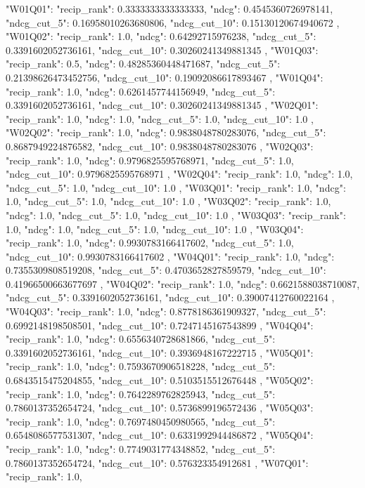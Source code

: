 {
 "W01Q01": {
  "recip_rank": 0.3333333333333333,
  "ndcg": 0.4545360726978141,
  "ndcg_cut_5": 0.16958010263680806,
  "ndcg_cut_10": 0.15130120674940672
 },
 "W01Q02": {
  "recip_rank": 1.0,
  "ndcg": 0.64292715976238,
  "ndcg_cut_5": 0.3391602052736161,
  "ndcg_cut_10": 0.30260241349881345
 },
 "W01Q03": {
  "recip_rank": 0.5,
  "ndcg": 0.48285360448471687,
  "ndcg_cut_5": 0.21398626473452756,
  "ndcg_cut_10": 0.19092086617893467
 },
 "W01Q04": {
  "recip_rank": 1.0,
  "ndcg": 0.6261457744156949,
  "ndcg_cut_5": 0.3391602052736161,
  "ndcg_cut_10": 0.30260241349881345
 },
 "W02Q01": {
  "recip_rank": 1.0,
  "ndcg": 1.0,
  "ndcg_cut_5": 1.0,
  "ndcg_cut_10": 1.0
 },
 "W02Q02": {
  "recip_rank": 1.0,
  "ndcg": 0.9838048780283076,
  "ndcg_cut_5": 0.8687949224876582,
  "ndcg_cut_10": 0.9838048780283076
 },
 "W02Q03": {
  "recip_rank": 1.0,
  "ndcg": 0.9796825595768971,
  "ndcg_cut_5": 1.0,
  "ndcg_cut_10": 0.9796825595768971
 },
 "W02Q04": {
  "recip_rank": 1.0,
  "ndcg": 1.0,
  "ndcg_cut_5": 1.0,
  "ndcg_cut_10": 1.0
 },
 "W03Q01": {
  "recip_rank": 1.0,
  "ndcg": 1.0,
  "ndcg_cut_5": 1.0,
  "ndcg_cut_10": 1.0
 },
 "W03Q02": {
  "recip_rank": 1.0,
  "ndcg": 1.0,
  "ndcg_cut_5": 1.0,
  "ndcg_cut_10": 1.0
 },
 "W03Q03": {
  "recip_rank": 1.0,
  "ndcg": 1.0,
  "ndcg_cut_5": 1.0,
  "ndcg_cut_10": 1.0
 },
 "W03Q04": {
  "recip_rank": 1.0,
  "ndcg": 0.9930783166417602,
  "ndcg_cut_5": 1.0,
  "ndcg_cut_10": 0.9930783166417602
 },
 "W04Q01": {
  "recip_rank": 1.0,
  "ndcg": 0.7355309808519208,
  "ndcg_cut_5": 0.4703652827859579,
  "ndcg_cut_10": 0.41966500663677697
 },
 "W04Q02": {
  "recip_rank": 1.0,
  "ndcg": 0.6621588038710087,
  "ndcg_cut_5": 0.3391602052736161,
  "ndcg_cut_10": 0.39007412760022164
 },
 "W04Q03": {
  "recip_rank": 1.0,
  "ndcg": 0.8778186361909327,
  "ndcg_cut_5": 0.6992148198508501,
  "ndcg_cut_10": 0.7247145167543899
 },
 "W04Q04": {
  "recip_rank": 1.0,
  "ndcg": 0.6556340728681866,
  "ndcg_cut_5": 0.3391602052736161,
  "ndcg_cut_10": 0.3936948167222715
 },
 "W05Q01": {
  "recip_rank": 1.0,
  "ndcg": 0.7593670906518228,
  "ndcg_cut_5": 0.6843515475204855,
  "ndcg_cut_10": 0.5103515512676448
 },
 "W05Q02": {
  "recip_rank": 1.0,
  "ndcg": 0.7642289762825943,
  "ndcg_cut_5": 0.7860137352654724,
  "ndcg_cut_10": 0.5736899196572436
 },
 "W05Q03": {
  "recip_rank": 1.0,
  "ndcg": 0.7697480450980565,
  "ndcg_cut_5": 0.6548086577531307,
  "ndcg_cut_10": 0.6331992944486872
 },
 "W05Q04": {
  "recip_rank": 1.0,
  "ndcg": 0.7749031774348852,
  "ndcg_cut_5": 0.7860137352654724,
  "ndcg_cut_10": 0.576323354912681
 },
 "W07Q01": {
  "recip_rank": 1.0,
}}
